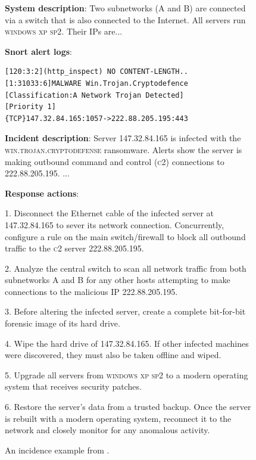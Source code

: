 \documentclass[sigconf]{acmart}
\begin{document}
\begin{figure}
\begin{tcolorbox}[
  title=Incident Example from CTU-Malware-2014,
  colback=gray!5,
  colframe=gray!60,
  boxrule=0.5pt,
  arc=2pt,
  left=4pt,
  right=4pt,
  top=4pt,
  bottom=4pt
]
\small
\textbf{System description}: Two subnetworks (A and B) are connected via a switch that is also connected to the Internet. All servers run \textsc{windows xp sp2}. Their IPs are...

\textbf{Snort alert logs}: 
\begin{verbatim}
[120:3:2](http_inspect) NO CONTENT-LENGTH..
[1:31033:6]MALWARE Win.Trojan.Cryptodefence
[Classification:A Network Trojan Detected] 
[Priority 1]
{TCP}147.32.84.165:1057->222.88.205.195:443 
\end{verbatim}

\textbf{Incident description}: Server 147.32.84.165 is infected with the \textsc{win.trojan.cryptodefense} ransomware. Alerts show the server
is making outbound command and control (\textsc{c}2) connections to
222.88.205.195. ...

\textbf{Response actions}:

1. Disconnect the Ethernet cable of the infected server at
147.32.84.165 to sever its network connection. Concurrently, configure a rule on the main switch/firewall to block all outbound
traffic to the \textsc{c}2 server 222.88.205.195.

2. Analyze the central switch to scan all network traffic from
both subnetworks A and B for any other hosts attempting to make
connections to the malicious IP 222.88.205.195.

3. Before altering the infected server, create a complete bit-for-bit
forensic image of its hard drive. 

4. Wipe the hard drive of 147.32.84.165. If other infected machines
were discovered, they must also be taken offline and wiped.

5. Upgrade all servers from \textsc{windows xp sp2}
to a modern operating system that receives security patches.

6. Restore the server’s data from a trusted backup. Once the server is
rebuilt with a modern operating system, reconnect it to the network
and closely monitor for any anomalous activity.
\end{tcolorbox}
\caption{An incidence example from \cite{GARCIA2014100}.}
    \label{fig:incidence-example}
\end{figure}
\end{document}
